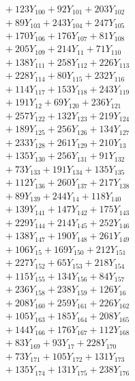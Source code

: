 \documentclass[a4paper,10pt]{article}
\begin{document}
{\begin{align}
&\quad  + 123Y_{100} + 92Y_{101} + 203Y_{102} \\[0.5ex]
&\quad  + 89Y_{103} + 243Y_{104} + 247Y_{105} \\[0.5ex]
&\quad  + 170Y_{106} + 176Y_{107} + 81Y_{108} \\[0.5ex]
&\quad  + 205Y_{109} + 214Y_{11} + 71Y_{110} \\[0.5ex]
&\quad  + 138Y_{111} + 258Y_{112} + 226Y_{113} \\[0.5ex]
&\quad  + 228Y_{114} + 80Y_{115} + 232Y_{116} \\[0.5ex]
&\quad  + 114Y_{117} + 153Y_{118} + 243Y_{119} \\[0.5ex]
&\quad  + 191Y_{12} + 69Y_{120} + 236Y_{121} \\[0.5ex]
&\quad  + 257Y_{122} + 132Y_{123} + 219Y_{124} \\[0.5ex]
&\quad  + 189Y_{125} + 256Y_{126} + 134Y_{127} \\[0.5ex]
&\quad  + 233Y_{128} + 261Y_{129} + 210Y_{13} \\[0.5ex]
&\quad  + 135Y_{130} + 256Y_{131} + 91Y_{132} \\[0.5ex]
&\quad  + 73Y_{133} + 191Y_{134} + 135Y_{135} \\[0.5ex]
&\quad  + 112Y_{136} + 260Y_{137} + 217Y_{138} \\[0.5ex]
&\quad  + 89Y_{139} + 244Y_{14} + 118Y_{140} \\[0.5ex]
&\quad  + 139Y_{141} + 147Y_{142} + 175Y_{143} \\[0.5ex]
&\quad  + 229Y_{144} + 214Y_{145} + 252Y_{146} \\[0.5ex]
&\quad  + 138Y_{147} + 190Y_{148} + 261Y_{149} \\[0.5ex]
&\quad  + 106Y_{15} + 169Y_{150} + 212Y_{151} \\[0.5ex]
&\quad  + 227Y_{152} + 65Y_{153} + 218Y_{154} \\[0.5ex]
&\quad  + 115Y_{155} + 134Y_{156} + 84Y_{157} \\[0.5ex]
&\quad  + 236Y_{158} + 238Y_{159} + 126Y_{16} \\[0.5ex]
&\quad  + 208Y_{160} + 259Y_{161} + 226Y_{162} \\[0.5ex]
&\quad  + 105Y_{163} + 185Y_{164} + 208Y_{165} \\[0.5ex]
&\quad  + 144Y_{166} + 176Y_{167} + 112Y_{168} \\[0.5ex]
&\quad  + 83Y_{169} + 93Y_{17} + 228Y_{170} \\[0.5ex]
&\quad  + 73Y_{171} + 105Y_{172} + 131Y_{173} \\[0.5ex]
&\quad  + 135Y_{174} + 131Y_{175} + 238Y_{176} \\[0.5ex]

\end{align}}
\end{document}
